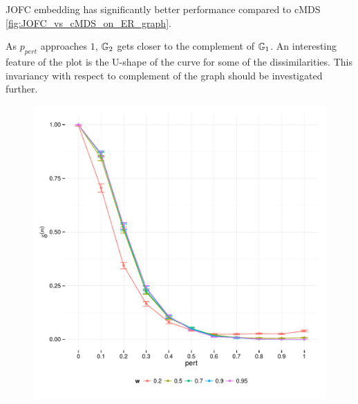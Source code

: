\documentclass[12pt,oneside,final]{thesis}\usepackage[]{graphicx}\usepackage[]{color}
\makeatletter
\def\maxwidth{ %
  \ifdim\Gin@nat@width>\linewidth
    \linewidth
  \else
    \Gin@nat@width
  \fi
}
\newenvironment{knitrout}{}{} %
\makeatother
\begin{document}
JOFC embedding  has significantly better performance compared to cMDS \ref{fig:JOFC_vs_cMDS_on_ER_graph}. 



As $p_{pert}$ approaches $1$, $\mathbb{G}_2$ gets closer to the complement of $\mathbb{G}_1$. An interesting feature of the plot is the U-shape of the curve for some of the dissimilarities. This invariancy with respect to complement of the graph should be investigated further.  










\begin{knitrout}
\color{fgcolor}\begin{figure}[]

\includegraphics[width=\maxwidth]{figure/JOFC-on-ER-Graph-w_param-plot} \caption[]{\label{fig:JOFC-on-ER-Graph-w_param-plot}}
\end{figure}


\end{knitrout}
\end{document}
